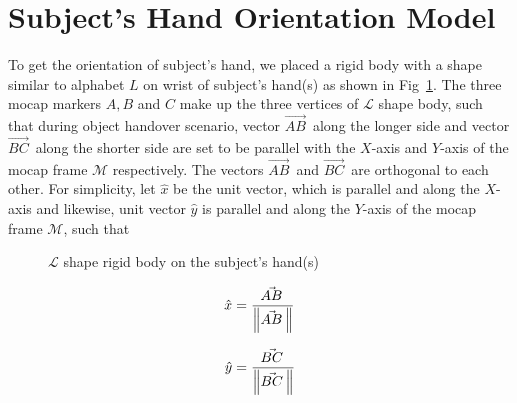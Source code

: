 \newpage
\section{Subject's Hand Orientation Model}\label{hand_orientation}

To get the orientation of subject's hand, we placed a rigid body with a shape similar to alphabet $L$ on wrist of subject's hand(s) as shown in Fig~\ref{fig:lshapes}. The three mocap markers $A, B$ and $C$ make up the three vertices of $\mathcal{L}$ shape body, such that during object handover scenario, vector $\vec{AB}^{\,}$ along the longer side and vector $\vec{BC}^{\,}$ along the shorter side are set to be parallel with the $X$-axis and $Y$-axis of the mocap frame $\mathcal{M}$ respectively. The vectors $\vec{AB}^{\,}$ and $\vec{BC}^{\,}$ are orthogonal to each other. For simplicity, let $\hat{x}$ be the unit vector, which is parallel and along the $X$-axis and likewise, unit vector $\hat{y}$ is parallel and along the $Y$-axis of the mocap frame $\mathcal{M}$, such that

\begin{figure}[h]
	\caption{$\mathcal{L}$ shape rigid body on the subject's hand(s)}
	\label{fig:lshapes}
\end{figure}

\begin{equation*}
\hat{x} = \frac{\vec{AB}^{\,}}{\norm{\vec{AB}^{\,}}}
\end{equation*}

\begin{equation*}
\hat{y} = \frac{\vec{BC}^{\,}}{\norm{\vec{BC}^{\,}}}
\end{equation*}

